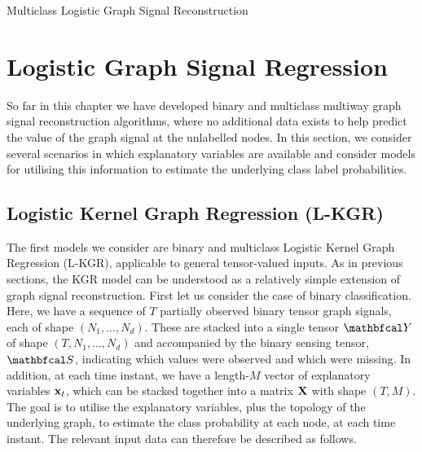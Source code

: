 \begin{algorithm}[ht]
\begin{algorithmic}
    \vspace{0.15cm}
    \vspace{0.15cm}
    \EndWhile
    \vspace{0.25cm}
    \vspace{0.15cm}
    \end{algorithmic}
    \caption{Multiclass Logistic Graph Signal Reconstruction}
    \label{al:LGSR_mc}
\end{algorithm}

\section{Logistic Graph Signal Regression} 

\label{sec:logistic_regression}

So far in this chapter we have developed binary and multiclass multiway graph signal reconstruction algorithms, where no additional data exists to help predict the value of the graph signal at the unlabelled nodes. In this section, we consider several scenarios in which explanatory variables are available and consider models for utilising this information to estimate the underlying class label probabilities.

\subsection{Logistic Kernel Graph Regression (L-KGR)}

\label{sec:lkgr}

The first models we consider are binary and multiclass Logistic Kernel Graph Regression (L-KGR), applicable to general tensor-valued inputs. As in previous sections, the KGR model can be understood as a relatively simple extension of graph signal reconstruction. First let us consider the case of binary classification. Here, we have a sequence of $T$ partially observed binary tensor graph signals, each of shape $(N_1, ..., N_d)$. These are stacked into a single tensor $\Yt$ of shape $(T, N_1, ..., N_d)$ and accompanied by the binary sensing tensor, $\St$, indicating which values were observed and which were missing. In addition, at each time instant, we have a length-$M$ vector of explanatory variables $\mathbf{x}_t$, which can be stacked together into a matrix $\mathbf{X}$ with shape $(T, M)$. The goal is to utilise the explanatory variables, plus the topology of the underlying graph, to estimate the class probability at each node, at each time instant. The relevant input data can therefore be described as follows. 


